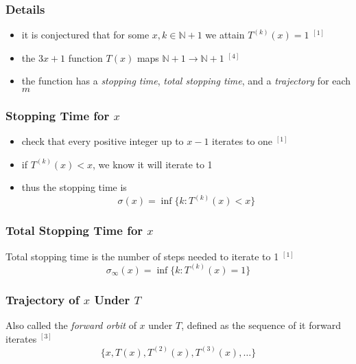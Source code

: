 \documentclass[12pt, a4paper, reqno]{amsart}
\begin{document}
\subsubsection{Details}

\begin{itemize}
    \item it is conjectured that for some $x,k \in \mathbb{N} + 1$ we attain 
        $T^{(k)}(x)=1$ $^{[1]}$
    \item the $3x+1$ function $T(x)$ maps 
        $\mathbb{N} + 1 \rightarrow \mathbb{N} + 1$ $^{[4]}$
    \item the function has a \emph{stopping time}, \emph{total stopping time}, 
        and a \emph{trajectory} for each $m$
\end{itemize}

\subsubsection{Stopping Time for $x$}

\begin{itemize}
    \item check that every positive integer up to $x - 1$ iterates to one $^{[1]}$
    \item if $T^{(k)}(x) < x$, we know it will iterate to 1
    \item thus the stopping time is 
        \begin{equation}
            \sigma(x)=\inf\{k:T^{(k)}(x) < x\}
        \end{equation}
\end{itemize}

\subsubsection{Total Stopping Time for $x$}

Total stopping time is the number of steps needed to iterate to 1 $^{[1]}$
\begin{equation}
    \sigma_{\infty}(x)=\inf\{k:T^{(k)}(x)=1\}
\end{equation}

\subsubsection{Trajectory of $x$ Under $T$}

Also called the \emph{forward orbit} of $x$ under $T$, defined as the sequence 
of it forward iterates $^{[3]}$
\begin{equation}
    \{x, T(x), T^{(2)}(x), T^{(3)}(x),\dots\}
\end{equation}
\end{document}
